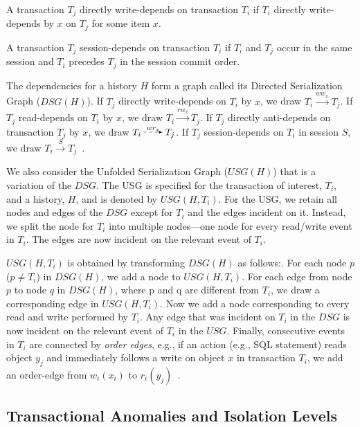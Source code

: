 \begin{definition}
A transaction $T_j$ directly write-depends on transaction $T_i$ if
$T_i$ directly write-depends by $x$ on $T_j$ for some item $x$.
\end{definition}

\begin{definition}
\label{def:sd1}
A transaction $T_j$ session-depends on transaction $T_i$ if $T_i$ and
$T_j$ occur in the same session and $T_i$ precedes $T_j$ in the
session commit order.
\end{definition}

The dependencies for a history $H$ form a graph called its Directed
Serialization Graph ($DSG(H)$). If $T_j$ directly write-depends on
$T_i$ by $x$, we draw $T_i\overset{ww_x}\longrightarrow T_j$. If $T_j$
read-depends on $T_i$ by $x$, we draw
$T_i \overset{rw_x}\longrightarrow T_j$. If $T_j$ directly
anti-depends on transaction $T_j$ by $x$, we draw
$T_i \overset{wr_x}\DashedArrow T_j$. If $T_j$ session-depends on
$T_i$ in session $S$, we draw $T_i \overset{S}\longrightarrow
T_j$~\cite[Definition 8]{adya}.

We also consider the Unfolded Serialization Graph ($USG(H)$) that is a
variation of the $DSG$. The USG is speciﬁed for the transaction of
interest, $T_i$, and a history, $H$, and is denoted by $USG(H,
T_i)$. For the USG, we retain all nodes and edges of the $DSG$ except
for $T_i$ and the edges incident on it. Instead, we split the node for
$T_i$ into multiple nodes---one node for every read/write event in
$T_i$. The edges are now incident on the relevant event of $T_i$.

$USG(H, T_i)$ is obtained by transforming $DSG(H)$ as follows:.  For
each node $p$ ($p \neq T_i$) in $DSG(H)$, we add a node to
$USG(H,T_i)$. For each edge from node $p$ to node $q$ in $DSG(H)$,
where p and q are different from $T_i$, we draw a corresponding edge
in $USG(H,T_i)$. Now we add a node corresponding to every read and
write performed by $T_i$. Any edge that was incident on $T_i$ in the
$DSG$ is now incident on the relevant event of $T_i$ in the
$USG$. Finally, consecutive events in $T_i$ are connected
by \textit{order edges}, e.g., if an action (e.g., SQL statement)
reads object $y_j$ and immediately follows a write on object $x$ in
transaction $T_i$, we add an order-edge from $w_i(x_i)$ to
$r_i(y_j)$~\cite[Section 4.2.1]{adya}.

\subsection{Transactional Anomalies and Isolation Levels}


